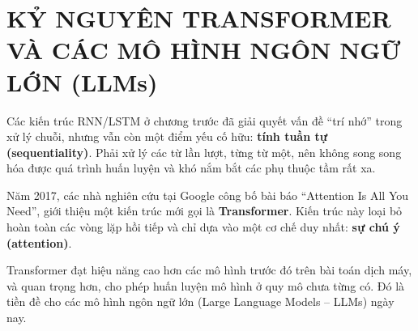 \chapter{KỶ NGUYÊN TRANSFORMER VÀ CÁC MÔ HÌNH NGÔN NGỮ LỚN (LLMs)}
\label{chap:transformer_llms}

Các kiến trúc RNN/LSTM ở chương trước đã giải quyết vấn đề “trí nhớ” trong xử lý chuỗi, nhưng vẫn còn một điểm yếu cố hữu: \textbf{tính tuần tự (sequentiality)}. Phải xử lý các từ lần lượt, từng từ một, nên không song song hóa được quá trình huấn luyện và khó nắm bắt các phụ thuộc tầm rất xa.

Năm 2017, các nhà nghiên cứu tại Google công bố bài báo “Attention Is All You Need”, giới thiệu một kiến trúc mới gọi là \textbf{Transformer}. Kiến trúc này loại bỏ hoàn toàn các vòng lặp hồi tiếp và chỉ dựa vào một cơ chế duy nhất: \textbf{sự chú ý (attention)}.

Transformer đạt hiệu năng cao hơn các mô hình trước đó trên bài toán dịch máy, và quan trọng hơn, cho phép huấn luyện mô hình ở quy mô chưa từng có. Đó là tiền đề cho các mô hình ngôn ngữ lớn (Large Language Models -- LLMs) ngày nay.